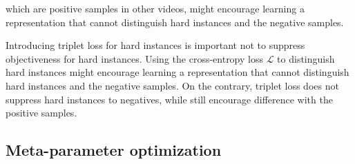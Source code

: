 \documentclass[letterpaper]{article} %
\begin{document}
which are positive samples in other videos, might encourage learning a representation that cannot distinguish hard instances and the negative samples.

Introducing triplet loss for hard instances is important not to suppress objectiveness for hard instances.
Using the cross-entropy loss $\mathcal{L}$ to distinguish hard instances might encourage learning a representation that cannot distinguish hard instances and the negative samples.
On the contrary, triplet loss does not suppress hard instances to negatives, while still encourage difference with the positive samples.
\fi

\subsection{Meta-parameter optimization}
\end{document}
